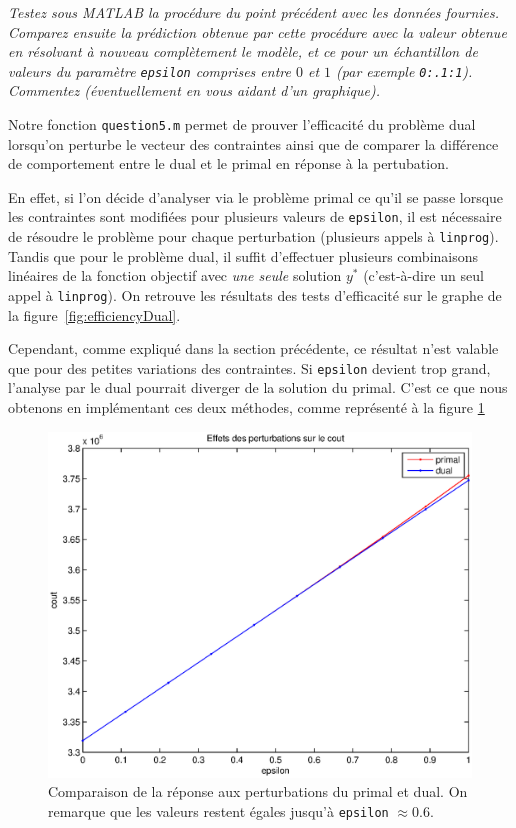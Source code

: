 \question %
\emph{Testez sous MATLAB la procédure du point précédent avec les données
fournies. Comparez ensuite la prédiction obtenue par cette procédure
avec la valeur obtenue en résolvant à nouveau complètement le modèle,
et ce pour un échantillon de valeurs du paramètre \texttt{epsilon} comprises
entre $0$ et $1$ (par exemple \texttt{0:.1:1}).
Commentez (éventuellement en vous aidant d'un graphique).}

Notre fonction \texttt{question5.m} permet de prouver l'efficacité
du problème dual lorsqu'on perturbe le vecteur des contraintes
ainsi que de comparer la différence de comportement entre le dual
et le primal en réponse à la pertubation.

En effet, si l'on décide d'analyser via le problème primal ce qu'il
se passe lorsque les contraintes sont modifiées pour plusieurs valeurs de \texttt{epsilon}, il est nécessaire de
résoudre le problème pour chaque perturbation
(plusieurs appels à \texttt{linprog}).
Tandis que pour le problème dual,
il suffit d'effectuer plusieurs combinaisons linéaires de la fonction objectif
avec \emph{une seule} solution $y^{*}$
(c'est-à-dire un seul appel à \texttt{linprog}).
On retrouve les résultats des tests d'efficacité
sur le graphe de la figure~\ref{fig:efficiencyDual}.

Cependant, comme expliqué dans la section précédente, ce résultat n'est valable que pour des petites variations des contraintes.
Si \texttt{epsilon} devient trop grand, l'analyse par le dual pourrait diverger de la solution du primal.
C'est ce que nous obtenons en implémentant ces deux méthodes, comme représenté à la figure \ref{fig:responseToPerturbations}

\begin{figure}
  \begin{center}
    \includegraphics[scale=0.6]{img/responseToPerturbations.eps}
    \caption{Comparaison de la réponse aux perturbations du primal
    et dual. On remarque que les valeurs restent égales jusqu'à \texttt{epsilon} $\approx 0.6$.}
    \label{fig:responseToPerturbations}
  \end{center}
\end{figure}

